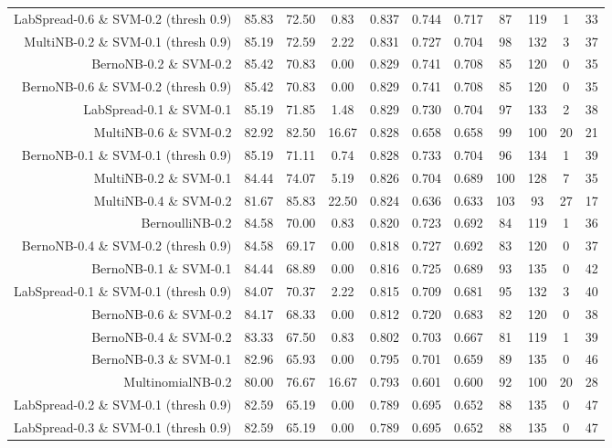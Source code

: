 \begin{table}[!htb]
\begin{tabular}{r|c|c|c|c|c|c|c|c|c|c}
LabSpread-0.6 \& SVM-0.2 (thresh 0.9) & 85.83 & 72.50 & 0.83 & 0.837 & 0.744 & 0.717 & 87 & 119 & 1 & 33 \\ 
MultiNB-0.2 \& SVM-0.1 (thresh 0.9) & 85.19 & 72.59 & 2.22 & 0.831 & 0.727 & 0.704 & 98 & 132 & 3 & 37 \\ 
BernoNB-0.2 \& SVM-0.2 & 85.42 & 70.83 & 0.00 & 0.829 & 0.741 & 0.708 & 85 & 120 & 0 & 35 \\ 
BernoNB-0.6 \& SVM-0.2 (thresh 0.9) & 85.42 & 70.83 & 0.00 & 0.829 & 0.741 & 0.708 & 85 & 120 & 0 & 35 \\ 
LabSpread-0.1 \& SVM-0.1 & 85.19 & 71.85 & 1.48 & 0.829 & 0.730 & 0.704 & 97 & 133 & 2 & 38 \\ 
MultiNB-0.6 \& SVM-0.2 & 82.92 & 82.50 & 16.67 & 0.828 & 0.658 & 0.658 & 99 & 100 & 20 & 21 \\ 
BernoNB-0.1 \& SVM-0.1 (thresh 0.9) & 85.19 & 71.11 & 0.74 & 0.828 & 0.733 & 0.704 & 96 & 134 & 1 & 39 \\ 
MultiNB-0.2 \& SVM-0.1 & 84.44 & 74.07 & 5.19 & 0.826 & 0.704 & 0.689 & 100 & 128 & 7 & 35 \\ 
MultiNB-0.4 \& SVM-0.2 & 81.67 & 85.83 & 22.50 & 0.824 & 0.636 & 0.633 & 103 & 93 & 27 & 17 \\ 
BernoulliNB-0.2 & 84.58 & 70.00 & 0.83 & 0.820 & 0.723 & 0.692 & 84 & 119 & 1 & 36 \\ 
BernoNB-0.4 \& SVM-0.2 (thresh 0.9) & 84.58 & 69.17 & 0.00 & 0.818 & 0.727 & 0.692 & 83 & 120 & 0 & 37 \\ 
BernoNB-0.1 \& SVM-0.1 & 84.44 & 68.89 & 0.00 & 0.816 & 0.725 & 0.689 & 93 & 135 & 0 & 42 \\ 
LabSpread-0.1 \& SVM-0.1 (thresh 0.9) & 84.07 & 70.37 & 2.22 & 0.815 & 0.709 & 0.681 & 95 & 132 & 3 & 40 \\ 
BernoNB-0.6 \& SVM-0.2 & 84.17 & 68.33 & 0.00 & 0.812 & 0.720 & 0.683 & 82 & 120 & 0 & 38 \\ 
BernoNB-0.4 \& SVM-0.2 & 83.33 & 67.50 & 0.83 & 0.802 & 0.703 & 0.667 & 81 & 119 & 1 & 39 \\ 
BernoNB-0.3 \& SVM-0.1 & 82.96 & 65.93 & 0.00 & 0.795 & 0.701 & 0.659 & 89 & 135 & 0 & 46 \\ 
MultinomialNB-0.2 & 80.00 & 76.67 & 16.67 & 0.793 & 0.601 & 0.600 & 92 & 100 & 20 & 28 \\ 
LabSpread-0.2 \& SVM-0.1 (thresh 0.9) & 82.59 & 65.19 & 0.00 & 0.789 & 0.695 & 0.652 & 88 & 135 & 0 & 47 \\ 
LabSpread-0.3 \& SVM-0.1 (thresh 0.9) & 82.59 & 65.19 & 0.00 & 0.789 & 0.695 & 0.652 & 88 & 135 & 0 & 47 \\ 

\end{tabular}
\end{table}
